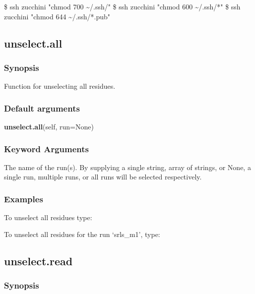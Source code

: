 \$ ssh zucchini "chmod 700 \~{}/.ssh/"
\$ ssh zucchini "chmod 600 \~{}/.ssh/*"
\$ ssh zucchini "chmod 644 \~{}/.ssh/*.pub"


\newpage

\subsection{unselect.all}


\subsubsection{Synopsis}

Function for unselecting all residues.

\subsubsection{Default arguments}

\textsf{\textbf{unselect.all}(self, run=None)}


\subsubsection{Keyword Arguments}

  The name of the run(s).  By supplying a single string, array of strings, or None, a single run, multiple runs, or all runs will be selected respectively.

\subsubsection{Examples}

To unselect all residues type:


To unselect all residues for the run `srls\_m1', type:




\newpage

\subsection{unselect.read}


\subsubsection{Synopsis}

